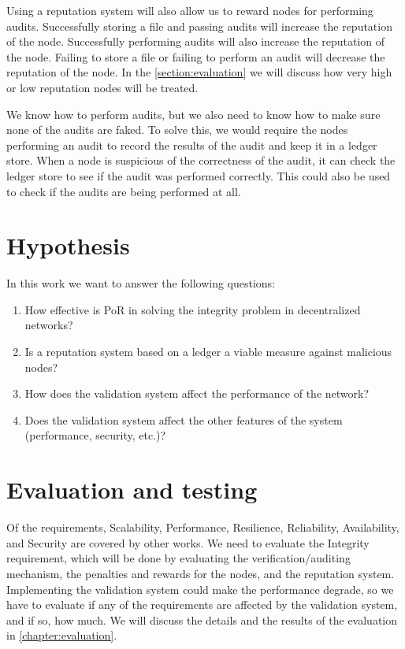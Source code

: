 Using a reputation system will also allow us to reward nodes for performing audits.
Successfully storing a file and passing audits will increase the reputation of the node.
Successfully performing audits will also increase the reputation of the node.
Failing to store a file or failing to perform an audit will decrease the reputation of the node.
In the \ref{section:evaluation} we will discuss how very high or low reputation nodes will be treated.

We know how to perform audits, but we also need to know how to make sure none of the
audits are faked.
To solve this, we would require the nodes performing an audit to record the results of the audit and keep
it in a ledger store.
When a node is suspicious of the correctness of the audit, it can check the ledger store to see if the audit
was performed correctly.
This could also be used to check if the audits are being performed at all.

\section{Hypothesis}

In this work we want to answer the following questions:
\begin{enumerate}
    \item How effective is PoR in solving the integrity problem in decentralized networks?
    \item Is a reputation system based on a ledger a viable measure against malicious nodes?
    \item How does the validation system affect the performance of the network?
    \item Does the validation system affect the other features of the system (performance, security, etc.)?
\end{enumerate}


\label{section:evaluation}
\section{Evaluation and testing}

Of the requirements, Scalability, Performance, Resilience, Reliability, Availability, and Security
are covered by other works.
We need to evaluate the Integrity requirement, which will be done by evaluating the verification/auditing mechanism,
the penalties and rewards for the nodes, and the reputation system.
Implementing the validation system could make the performance degrade, so we have to evaluate
if any of the requirements are affected by the validation system, and if so, how much.
We will discuss the details and the results of the evaluation in \ref{chapter:evaluation}.
